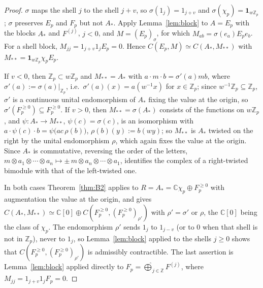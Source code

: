 \documentclass[11pt]{amsart}
\theoremstyle{definition}
\theoremstyle{remark}
\newcommand{\C}{\mathbb C}
\newcommand{\Z}{\mathbb Z}
\begin{document}
\begin{proof}
$\sigma$ maps the shell $j$ to the shell $j+v$, so $\sigma(1_j)=1_{j+v}$ and
$\sigma(\chi_p)=\mathbf 1_{w\Z_p}$; $\sigma$ preserves $E_p$ and $F_p$ but not
$A_*$.  Apply Lemma~\ref{lem:block} to $A=E_p$ with the blocks $A_*$ and
$F^{(j)}$, $j<0$, and $M=(E_p)_{\sigma}$, for which
$M_{ab}=\sigma(e_a)E_pe_b$.  For a shell block,
$M_{jj}=1_{j+v}1_jE_p=0$.  Hence $C(E_p,M)\simeq C(A_*,M_{**})$ with
$M_{**}=\mathbf 1_{w\Z_p}\chi_pE_p$.

If $v<0$, then $\Z_p\subset w\Z_p$ and $M_{**}=A_*$ with $a\cdot m\cdot
b=\sigma'(a)mb$, where $\sigma'(a):=\sigma(a)|_{\Z_p}$, i.e.\
$\sigma'(a)(x)=a(w^{-1}x)$ for $x\in\Z_p$; since $w^{-1}\Z_p\subseteq\Z_p$,
$\sigma'$ is a continuous unital endomorphism of $A_*$ fixing the value at the
origin, so $\sigma'(F_p^{\ge0})\subseteq F_p^{\ge0}$.  If $v>0$, then
$M_{**}=\sigma(A_*)$ consists of the functions on $w\Z_p$, and
$\psi:A_*\to M_{**}$, $\psi(c)=\sigma(c)$, is an isomorphism with
$a\cdot\psi(c)\cdot b=\psi\bigl(ac\,\rho(b)\bigr)$, $\rho(b)(y):=b(wy)$; so
$M_{**}$ is $A_*$ twisted on the right by the unital endomorphism $\rho$, which
again fixes the value at the origin.  Since $A_*$ is commutative, reversing
the order of the letters, $m\otimes a_1\otimes\cdots\otimes a_n\mapsto
\pm\,m\otimes a_n\otimes\cdots\otimes a_1$, identifies the complex of a
right-twisted bimodule with that of the left-twisted one.

In both cases Theorem~\ref{thm:B2} applies to $R=A_*=\C\chi_p\oplus
F_p^{\ge0}$ with augmentation the value at the origin, and gives
$C(A_*,M_{**})\simeq\C[0]\oplus C(F_p^{\ge0},(F_p^{\ge0})_{\rho'})$ with
$\rho'=\sigma'$ or $\rho$, the $\C[0]$ being the class of $\chi_p$.  The
endomorphism $\rho'$ sends $1_j$ to $1_{j-v}$ (or to $0$ when that shell is not
in $\Z_p$), never to $1_j$, so Lemma~\ref{lem:block} applied to the shells
$j\ge0$ shows that $C(F_p^{\ge0},(F_p^{\ge0})_{\rho'})$ is admissibly
contractible.  The last assertion is Lemma~\ref{lem:block} applied directly to
$F_p=\widehat\bigoplus_{j\in\Z}F^{(j)}$, where $M_{jj}=1_{j+v}1_jF_p=0$.
\end{proof}
\end{document}
